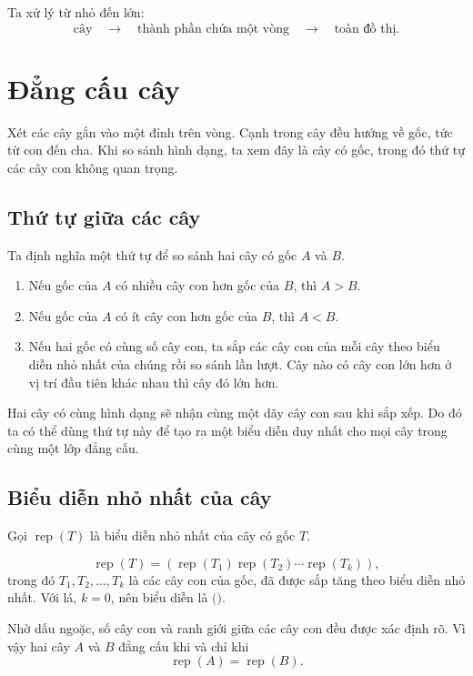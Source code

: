 \documentclass[11pt]{article}
\begin{document}
Ta xử lý từ nhỏ đến lớn:
\[
  \text{cây}\quad\longrightarrow\quad
  \text{thành phần chứa một vòng}\quad\longrightarrow\quad
  \text{toàn đồ thị}.
\]

\section{Đẳng cấu cây}

Xét các cây gắn vào một đỉnh trên vòng. Cạnh trong cây đều hướng về gốc, tức
từ con đến cha. Khi so sánh hình dạng, ta xem đây là cây có gốc, trong đó thứ
tự các cây con không quan trọng.

\subsection{Thứ tự giữa các cây}

Ta định nghĩa một thứ tự để so sánh hai cây có gốc \(A\) và \(B\).

\begin{enumerate}
  \item Nếu gốc của \(A\) có nhiều cây con hơn gốc của \(B\), thì \(A>B\).
  \item Nếu gốc của \(A\) có ít cây con hơn gốc của \(B\), thì \(A<B\).
  \item Nếu hai gốc có cùng số cây con, ta sắp các cây con của mỗi cây theo
  biểu diễn nhỏ nhất của chúng rồi so sánh lần lượt. Cây nào có cây con lớn
  hơn ở vị trí đầu tiên khác nhau thì cây đó lớn hơn.
\end{enumerate}

Hai cây có cùng hình dạng sẽ nhận cùng một dãy cây con sau khi sắp xếp. Do đó
ta có thể dùng thứ tự này để tạo ra một biểu diễn duy nhất cho mọi cây trong
cùng một lớp đẳng cấu.

\subsection{Biểu diễn nhỏ nhất của cây}

Gọi \(\operatorname{rep}(T)\) là biểu diễn nhỏ nhất của cây có gốc \(T\).

\[
  \operatorname{rep}(T)
  =
  \left(
    \operatorname{rep}(T_1)
    \operatorname{rep}(T_2)
    \cdots
    \operatorname{rep}(T_k)
  \right),
\]
trong đó \(T_1,T_2,\ldots,T_k\) là các cây con của gốc, đã được sắp tăng theo
biểu diễn nhỏ nhất. Với lá, \(k=0\), nên biểu diễn là \(\texttt{()}\).

Nhờ dấu ngoặc, số cây con và ranh giới giữa các cây con đều được xác định rõ.
Vì vậy hai cây \(A\) và \(B\) đẳng cấu khi và chỉ khi
\[
  \operatorname{rep}(A)=\operatorname{rep}(B).
\]
\end{document}
